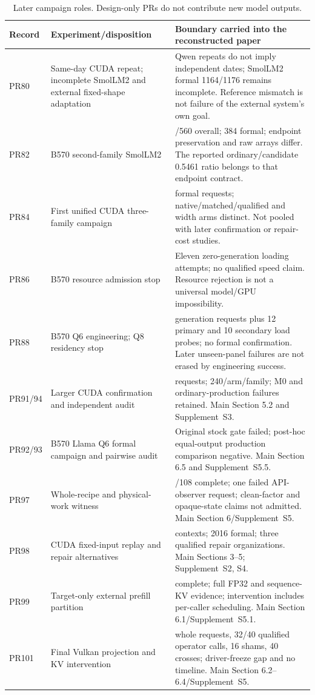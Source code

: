 \begin{table}[tp]\centering\small
\caption{Later campaign roles. Design-only PRs do not contribute new model outputs.}\label{tab:recentcampaigns}
\begin{tabular}{@{}>{\raggedright\arraybackslash}p{}>{\raggedright\arraybackslash}p{}>{\raggedright\arraybackslash}p{}@{}}
\toprule Record&Experiment/disposition&Boundary carried into the reconstructed paper\\\midrule
PR80&Same-day CUDA repeat; incomplete SmolLM2 and external fixed-shape adaptation&Qwen repeats do not imply independent dates; SmolLM2 formal 1164/1176 remains incomplete. Reference mismatch is not failure of the external system's own goal.\\
PR82&B570 second-family SmolLM2&560/560 overall; 384 formal; endpoint preservation and raw arrays differ. The reported ordinary/candidate 0.5461 ratio belongs to that endpoint contract.\\
PR84&First unified CUDA three-family campaign&3456 formal requests; native/matched/qualified and width arms distinct. Not pooled with later confirmation or repair-cost studies.\\
PR86&B570 resource admission stop&Eleven zero-generation loading attempts; no qualified speed claim. Resource rejection is not a universal model/GPU impossibility.\\
PR88&B570 Q6 engineering; Q8 residency stop&550 generation requests plus 12 primary and 10 secondary load probes; no formal confirmation. Later unseen-panel failures are not erased by engineering success.\\
PR91/94&Larger CUDA confirmation and independent audit&3600 requests; 240/arm/family; M0 and ordinary-production failures retained. Main Section 5.2 and Supplement~S3.\\
PR92/93&B570 Llama Q6 formal campaign and pairwise audit&Original stock gate failed; post-hoc equal-output production comparison negative. Main Section 6.5 and Supplement~S5.5.\\
PR97&Whole-recipe and physical-work witness&107/108 complete; one failed API-observer request; clean-factor and opaque-state claims not admitted. Main Section 6/Supplement~S5.\\
PR98&CUDA fixed-input replay and repair alternatives&24 contexts; 2016 formal; three qualified repair organizations. Main Sections 3--5; Supplement~S2, S4.\\
PR99&Target-only external prefill partition&63 complete; full FP32 and sequence-KV evidence; intervention includes per-caller scheduling. Main Section 6.1/Supplement~S5.1.\\
PR101&Final Vulkan projection and KV intervention&133 whole requests, 32/40 qualified operator calls, 16 shams, 40 crosses; driver-freeze gap and no timeline. Main Section 6.2--6.4/Supplement~S5.\\\bottomrule
\end{tabular}
\end{table}
